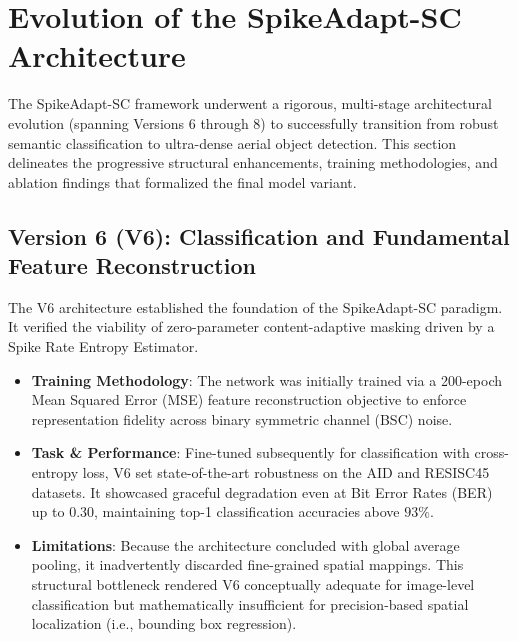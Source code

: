 \documentclass[10pt, conference]{IEEEtran}
\begin{document}
\section{Evolution of the SpikeAdapt-SC Architecture}
\label{sec:architecture_evolution}

The SpikeAdapt-SC framework underwent a rigorous, multi-stage architectural evolution (spanning Versions 6 through 8) to successfully transition from robust semantic classification to ultra-dense aerial object detection. This section delineates the progressive structural enhancements, training methodologies, and ablation findings that formalized the final model variant.

\subsection{Version 6 (V6): Classification and Fundamental Feature Reconstruction}
The V6 architecture established the foundation of the SpikeAdapt-SC paradigm. It verified the viability of zero-parameter content-adaptive masking driven by a Spike Rate Entropy Estimator.
\begin{itemize}
    \item \textbf{Training Methodology}: The network was initially trained via a 200-epoch Mean Squared Error (MSE) feature reconstruction objective to enforce representation fidelity across binary symmetric channel (BSC) noise.
    \item \textbf{Task \& Performance}: Fine-tuned subsequently for classification with cross-entropy loss, V6 set state-of-the-art robustness on the AID and RESISC45 datasets. It showcased graceful degradation even at Bit Error Rates (BER) up to $0.30$, maintaining top-1 classification accuracies above $93\%$.
    \item \textbf{Limitations}: Because the architecture concluded with global average pooling, it inadvertently discarded fine-grained spatial mappings. This structural bottleneck rendered V6 conceptually adequate for image-level classification but mathematically insufficient for precision-based spatial localization (i.e., bounding box regression).
\end{itemize}
\end{document}
